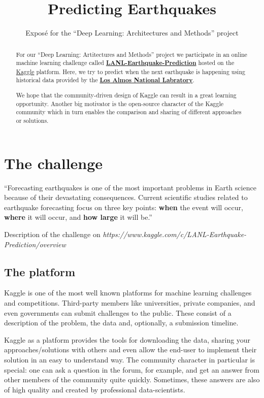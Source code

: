 \documentclass[colorback,accentcolor=tud9c,12pt]{tudreport}
\title{Predicting Earthquakes}
\subtitle{Expos\'{e} for the ``Deep Learning: Architectures and Methods'' project}
\begin{document}
	\maketitle
	\begin{abstract}
		For our ``Deep Learning: Artitectures and Methods'' project we participate in an online machine learning challenge called 
		\textbf{\href{https://www.kaggle.com/c/LANL-Earthquake-Prediction/overview}{LANL-Earthquake-Prediction}} hosted on the \href{https://www.kaggle.com}{Kaggle} platform.
		Here, we try to predict when the next earthquake is happening using historical data provided by the \textbf{\href{https://www.lanl.gov/}{Los Almos National Labratory}}.
		
		We hope that the community-driven design of Kaggle can result in a great learning opportunity. Another big motivator is the open-source character of the Kaggle community which in turn enables the comparison and sharing of different approaches or solutions.
	\end{abstract}

	\chapter{The challenge}
	
	\epigraph{``Forecasting earthquakes is one of the most important problems in Earth science because of their devastating consequences. Current scientific studies related to earthquake forecasting focus on three key points: \textbf{when} the event will occur, \textbf{where} it will occur, and \textbf{how large} it will be.''}{Description of the challenge on \textit{https://www.kaggle.com/c/LANL-Earthquake-Prediction/overview}}
	
	\section{The platform}
	Kaggle is one of the most well known platforms for machine learning challenges and competitions.
	Third-party members like universities, private companies, and even governments can submit challenges to the public. These consist of a description of the problem, the data and, optionally, a submission timeline.
	
	Kaggle as a platform provides the tools for downloading the data, sharing your approaches/solutions with others and even allow the end-user to implement their solution in an easy to understand way.
	The community character in particular is special: one can ask a question in the forum, for example, and get an answer from other members of the community quite quickly. Sometimes, these answers are also of high quality and created by professional data-scientists.
	
\end{document}
